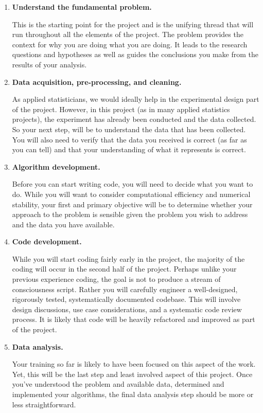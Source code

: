 \documentclass[11pt, oneside]{article}   	%
\begin{document}
\begin{enumerate}

\item \textbf{Understand the fundamental problem.}

This is the starting point for the project and is the unifying thread that will
run throughout all the elements of the project.  The problem provides the
context for why you are doing what you are doing.  It leads to the research questions
and hypotheses as well as guides the conclusions you make from the results of
your analysis.

\item \textbf{Data acquisition, pre-processing, and cleaning.}

As applied statisticians, we would ideally help in the experimental design part
of the project.  However, in this project (as in many applied statistics
projects), the experiment has already been conducted and the data collected.
So your next step, will be to understand the data that has been collected.  You
will also need to verify that the data you received is correct (as far as you
can tell) and that your understanding of what it represents is correct.

\item \textbf{Algorithm development.}

Before you can start writing code, you will need to decide what you want to do.
While you will want to consider computational efficiency and numerical
stability, your first and primary objective will be to determine whether your
approach to the problem is sensible given the problem you wish to address and
the data you have available.

\item \textbf{Code development.}

While you will start coding fairly early in the project, the majority of the
coding will occur in the second half of the project.  Perhaps unlike your
previous experience coding, the goal is not to produce a stream of
consciousness script.  Rather you will carefully engineer a well-designed,
rigorously tested, systematically documented codebase.  This will involve
design discussions, use case considerations, and a systematic code review
process.  It is likely that code will be heavily refactored and improved as
part of the project.

\item \textbf{Data analysis.}

Your training so far is likely to have been focused on this aspect of the
work.  Yet, this will be the last step and least involved aspect of this
project.  Once you've understood the problem and available data, determined and
implemented your algorithms, the final data analysis step should be more or
less straightforward.

\end{enumerate}
\end{document}
